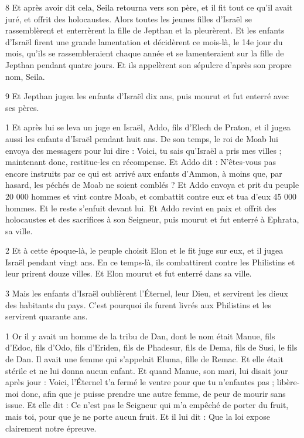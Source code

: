 \par 8 Et après avoir dit cela, Seila retourna vers son père, et il fit tout ce qu'il avait juré, et offrit des holocaustes. Alors toutes les jeunes filles d'Israël se rassemblèrent et enterrèrent la fille de Jepthan et la pleurèrent. Et les enfants d'Israël firent une grande lamentation et décidèrent ce mois-là, le 14e jour du mois, qu'ils se rassembleraient chaque année et se lamenteraient sur la fille de Jepthan pendant quatre jours. Et ils appelèrent son sépulcre d'après son propre nom, Seila.

\par 9 Et Jepthan jugea les enfants d'Israël dix ans, puis mourut et fut enterré avec ses pères.


\par 1 Et après lui se leva un juge en Israël, Addo, fils d'Elech de Praton, et il jugea aussi les enfants d'Israël pendant huit ans. De son temps, le roi de Moab lui envoya des messagers pour lui dire : Voici, tu sais qu'Israël a pris mes villes ; maintenant donc, restitue-les en récompense. Et Addo dit : N'êtes-vous pas encore instruits par ce qui est arrivé aux enfants d'Ammon, à moins que, par hasard, les péchés de Moab ne soient comblés ? Et Addo envoya et prit du peuple 20 000 hommes et vint contre Moab, et combattit contre eux et tua d'eux 45 000 hommes. Et le reste s'enfuit devant lui. Et Addo revint en paix et offrit des holocaustes et des sacrifices à son Seigneur, puis mourut et fut enterré à Ephrata, sa ville.

\par 2 Et à cette époque-là, le peuple choisit Elon et le fit juge sur eux, et il jugea Israël pendant vingt ans. En ce temps-là, ils combattirent contre les Philistins et leur prirent douze villes. Et Elon mourut et fut enterré dans sa ville.

\par 3 Mais les enfants d'Israël oublièrent l'Éternel, leur Dieu, et servirent les dieux des habitants du pays. C'est pourquoi ils furent livrés aux Philistins et les servirent quarante ans.


\par 1 Or il y avait un homme de la tribu de Dan, dont le nom était Manue, fils d'Edoc, fils d'Odo, fils d'Eriden, fils de Phadesur, fils de Dema, fils de Susi, le fils de Dan. Il avait une femme qui s'appelait Eluma, fille de Remac. Et elle était stérile et ne lui donna aucun enfant. Et quand Manue, son mari, lui disait jour après jour : Voici, l'Éternel t'a fermé le ventre pour que tu n'enfantes pas ; libère-moi donc, afin que je puisse prendre une autre femme, de peur de mourir sans issue. Et elle dit : Ce n'est pas le Seigneur qui m'a empêché de porter du fruit, mais toi, pour que je ne porte aucun fruit. Et il lui dit : Que la loi expose clairement notre épreuve.

